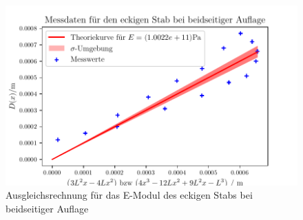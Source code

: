   \begin{figure}
    \centering
    \includegraphics{build/plot9.pdf}
    \caption{Ausgleichsrechnung für das E-Modul des eckigen Stabs bei beidseitiger Auflage}
    \label{fig:Messwerte4}
  \end{figure}
  \newpage

